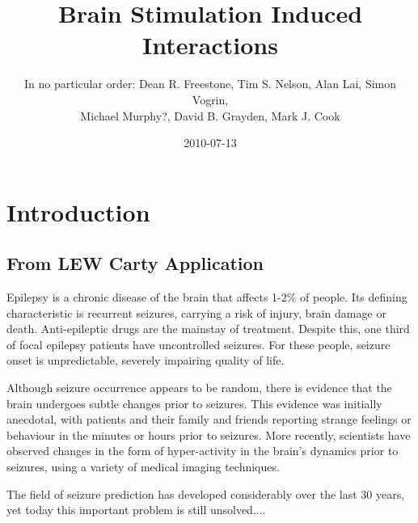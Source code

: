 \documentclass[]{article}
\title{Brain Stimulation Induced Interactions}
\author{In no particular order: Dean R. Freestone, Tim S. Nelson, Alan Lai, Simon Vogrin,\\
 Michael Murphy?, David B. Grayden, Mark J. Cook}
\date{2010-07-13}
\begin{document}
\ifpdf
{}
\else
{}
\fi

\maketitle


\begin{abstract}
\end{abstract}

\section{Introduction}
\subsection{From LEW Carty Application}
Epilepsy is a chronic disease of the brain that affects 1-2\% of people. Its defining characteristic is recurrent seizures, carrying a risk of injury, brain damage or death. Anti-epileptic drugs are the mainstay of treatment.  Despite this, one third of focal epilepsy patients have uncontrolled seizures. For these people, seizure onset is unpredictable, severely impairing quality of life.

Although seizure occurrence appears to be random, there is evidence that the brain undergoes subtle changes prior to seizures. This evidence was initially anecdotal, with patients and their family and friends reporting strange feelings or behaviour in the minutes or hours prior to seizures. More recently, scientists have observed changes in the form of hyper-activity in the brain’s dynamics prior to seizures, using a variety of medical imaging techniques.

The field of seizure prediction has developed considerably over the last 30 years, yet today this important problem is still unsolved....
\end{document}
